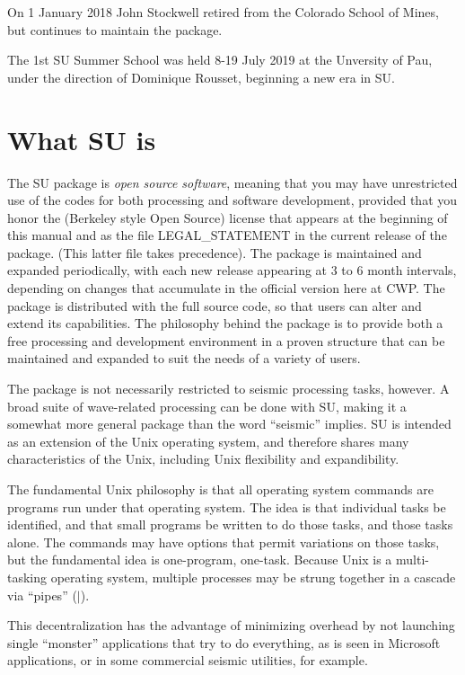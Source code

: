 On 1 January 2018 John Stockwell retired from the Colorado School of 
Mines, but continues to maintain the package.

The 1st SU Summer School was held 8-19 July 2019 at the Unversity of Pau, under the direction of Dominique Rousset, beginning a new era in SU.

\section{What SU is}

The SU package is {\em open source software}, meaning that you may have
unrestricted use of the codes for both processing and software development,
provided that you honor the (Berkeley style Open Source) license 
that appears at the beginning of 
this manual and as the file LEGAL\_STATEMENT in the current release
of the package. (This latter file takes precedence).
The package is maintained and expanded periodically, with
each new release appearing at 3 to 6 month intervals, depending
on changes that accumulate in the official version here at CWP.
The package is distributed with the full source code, so that users
can alter and extend its capabilities.   The philosophy behind the package
is to provide both a free processing and development environment
in a proven structure that can be maintained and expanded to suit
the needs of a variety of users.

The package is not necessarily restricted to seismic processing tasks,
however.  A broad suite of wave-related processing can be done with SU,
making it a somewhat more general package than the word ``seismic'' implies.
SU is intended as an extension of the Unix operating system,
and therefore shares many characteristics of the Unix, including  Unix
flexibility and expandibility. 

The fundamental Unix philosophy is that all operating system commands
are programs run under that operating system.
The idea is that individual tasks be identified, and that small programs
be written to do those tasks, and those tasks alone.
The commands may have options that permit variations on those tasks,
but the fundamental idea is one-program, one-task.
Because Unix is a multi-tasking operating system, multiple processes
may be strung together in a cascade via ``pipes'' ($|$).

This decentralization has the advantage of minimizing overhead
by not launching single ``monster'' applications that try to do
everything, as is seen in Microsoft applications, or 
in some commercial seismic utilities, for example.

